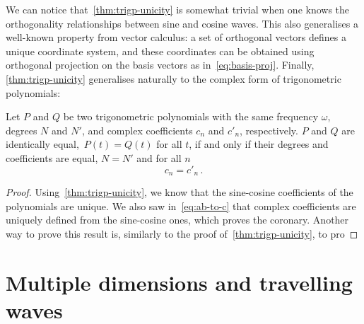 We can notice that~\cref{thm:trigp-unicity} is somewhat trivial when one knows the orthogonality relationships between sine and cosine waves. This also generalises a well-known property from vector calculus: a set of orthogonal vectors defines a unique coordinate system, and these coordinates can be obtained using orthogonal projection on the basis vectors as in~\cref{eq:basis-proj}. Finally, \cref{thm:trigp-unicity} generalises naturally to the complex form of trigonometric polynomials:
\begin{corollary}
  Let $P$ and $Q$ be two trigonometric polynomials with the same frequency $\omega$, degrees $N$ and $N'$, and complex coefficients $c_n$ and $c'_n$, respectively. $P$ and $Q$ are identically equal,~\ie $P(t)=Q(t)$ for all $t$, if and only if their degrees and coefficients are equal, \ie $N=N'$ and for all $n$
  \begin{equation}
    c_n=c'_n\,.
  \end{equation}
\end{corollary}
\begin{proof}
  Using~\cref{thm:trigp-unicity}, we know that the sine-cosine coefficients of the polynomials are unique. We also saw in~\cref{eq:ab-to-c} that complex coefficients are uniquely defined from the sine-cosine ones, which proves the coronary. Another way to prove this result is, similarly to the proof of~\cref{thm:trigp-unicity}, to pro
\end{proof}
\section{Multiple dimensions and travelling waves}

